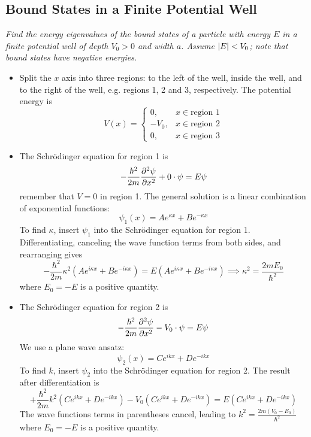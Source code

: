 \documentclass[11pt, a4paper]{article}
\newcommand{\Schro}{Schr\"{o}dinger\xspace}
\begin{document}
\subsection{Bound States in a Finite Potential Well}
\textit{Find the energy eigenvalues of the bound states of a particle with energy $ E $ in a finite potential well of depth $ V_{0} > 0 $ and width $ a $. Assume $ \abs{E} < V_{0} $; note that bound states have negative energies.}
\begin{itemize}
	\item Split the $ x $ axis into three regions: to the left of the well, inside the well, and to the right of the well, e.g. regions 1, 2 and 3, respectively. The potential energy is
	\begin{equation*}
		V(x) =
		\begin{cases}
			0, & x \in \text{region 1}\\
			- V_{0}, & x \in \text{region 2}\\
			0, & x \in \text{region 3}
		\end{cases}
	\end{equation*}
	
	\item The \Schro equation for region 1 is
	\begin{equation*}
		- \frac{\hbar^{2}}{2m}\pdv[2]{\psi}{x} + 0 \cdot \psi = E \psi 
	\end{equation*}
	remember that $ V = 0 $ in region 1. The general solution is a linear combination of exponential functions:
	\begin{equation*}
		\psi_{1}(x) = A e^{\kappa x} + B e^{- \kappa x}
	\end{equation*}
	To find $ \kappa $, insert $ \psi_{1} $ into the \Schro equation for region 1. Differentiating, canceling the wave function terms from both sides, and rearranging gives
	\begin{equation*}
		-\frac{\hbar^{2}}{2m} \kappa^{2}\left(Ae^{i\kappa x} + B e^{- i\kappa x}\right) = E \left(A e^{i\kappa x} + B e^{- i\kappa x}\right) \implies \kappa^{2} = \frac{2mE_{0}}{\hbar^{2}}
	\end{equation*}
	where $ E_{0} = - E $ is a positive quantity.
	
	\item The \Schro equation for region 2 is
	\begin{equation*}
		- \frac{\hbar^{2}}{2m}\pdv[2]{\psi}{x} - V_{0} \cdot \psi = E \psi
	\end{equation*}
	We use a plane wave ansatz:
	\begin{equation*}
		\psi_{2}(x) = Ce^{ikx} + De^{-ikx}
	\end{equation*}
	To find $ k $, insert $ \psi_{2} $ into the \Schro equation for region 2. The result after differentiation is
	\begin{equation*}
		+\frac{\hbar^{2}}{2m} k^{2}\left(Ce^{ik x} + D e^{- ik x}\right) - V_{0}\left(C e^{ik x} + D e^{- ik x}\right)  = E \left(C e^{ik x} + D e^{- ik x}\right) 
	\end{equation*}
	The wave functions terms in parentheses cancel, leading to $ k^{2} = \frac{2m(V_{0}-E_{0})}{\hbar^{2}} $ where $ E_{0} = - E $ is a positive quantity.
	

\end{itemize}
\end{document}
